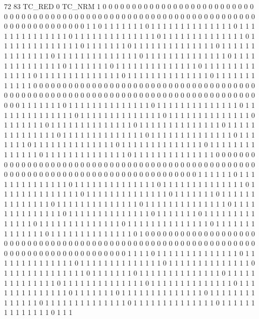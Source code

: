 72 83 TC_RED 0 TC_NRM 1
0 0 0 0 0 0 0 0 0 0 0 0 0 0 0 0 0 0 0 0 0 0 0 0 0 0 0 0 0 0 0 0 0 0 0 0 0 0 0 0 0 0 0 0 0 0 0 0 0 0 0 0 0 0 0 0 0 0 0 0 0 0 0 0 0 0 0 0 0 0 0 0 0 0 0 0 0 0 0 0 0 0 0 
1 1 0 1 1 1 1 1 1 1 0 1 1 1 1 1 1 1 1 1 1 1 1 1 1 0 1 1 1 1 1 1 1 1 1 1 1 1 1 1 0 1 1 1 1 1 1 1 1 1 1 1 1 1 1 0 1 1 1 1 1 1 1 1 1 1 1 1 1 1 0 1 1 1 1 1 1 1 1 1 1 1 1 
1 1 0 1 1 1 1 1 1 1 0 1 1 1 1 1 1 1 1 1 1 1 1 1 1 0 1 1 1 1 1 1 1 1 1 1 1 1 1 1 0 1 1 1 1 1 1 1 1 1 1 1 1 1 1 0 1 1 1 1 1 1 1 1 1 1 1 1 1 1 0 1 1 1 1 1 1 1 1 1 1 1 1 
1 1 0 1 1 1 1 1 1 1 0 1 1 1 1 1 1 1 1 1 1 1 1 1 1 0 1 1 1 1 1 1 1 1 1 1 1 1 1 1 0 1 1 1 1 1 1 1 1 1 1 1 1 1 1 0 1 1 1 1 1 1 1 1 1 1 1 1 1 1 0 1 1 1 1 1 1 1 1 1 1 1 1 
0 0 0 0 0 0 0 0 0 0 0 0 0 0 0 0 0 0 0 0 0 0 0 0 0 0 0 0 0 0 0 0 0 0 0 0 0 0 0 0 0 0 0 0 0 0 0 0 0 0 0 0 0 0 0 0 0 0 0 0 0 0 0 0 0 0 0 0 0 0 0 0 0 0 0 0 0 0 0 0 0 0 0 
0 1 1 1 1 1 1 1 0 1 1 1 1 1 1 1 1 1 1 1 1 1 1 0 1 1 1 1 1 1 1 1 1 1 1 1 1 1 0 1 1 1 1 1 1 1 1 1 1 1 1 1 1 0 1 1 1 1 1 1 1 1 1 1 1 1 1 1 0 1 1 1 1 1 1 1 1 1 1 1 1 1 1 
0 1 1 1 1 1 1 1 0 1 1 1 1 1 1 1 1 1 1 1 1 1 1 0 1 1 1 1 1 1 1 1 1 1 1 1 1 1 0 1 1 1 1 1 1 1 1 1 1 1 1 1 1 0 1 1 1 1 1 1 1 1 1 1 1 1 1 1 0 1 1 1 1 1 1 1 1 1 1 1 1 1 1 
0 1 1 1 1 1 1 1 0 1 1 1 1 1 1 1 1 1 1 1 1 1 1 0 1 1 1 1 1 1 1 1 1 1 1 1 1 1 0 1 1 1 1 1 1 1 1 1 1 1 1 1 1 0 1 1 1 1 1 1 1 1 1 1 1 1 1 1 0 1 1 1 1 1 1 1 1 1 1 1 1 1 1 
0 0 0 0 0 0 0 0 0 0 0 0 0 0 0 0 0 0 0 0 0 0 0 0 0 0 0 0 0 0 0 0 0 0 0 0 0 0 0 0 0 0 0 0 0 0 0 0 0 0 0 0 0 0 0 0 0 0 0 0 0 0 0 0 0 0 0 0 0 0 0 0 0 0 0 0 0 0 0 0 0 0 0 
1 1 1 1 1 1 0 1 1 1 1 1 1 1 1 1 1 1 1 1 1 0 1 1 1 1 1 1 1 1 1 1 1 1 1 1 0 1 1 1 1 1 1 1 1 1 1 1 1 1 1 0 1 1 1 1 1 1 1 1 1 1 1 1 1 1 0 1 1 1 1 1 1 1 1 1 1 1 1 1 1 0 1 
1 1 1 1 1 1 0 1 1 1 1 1 1 1 1 1 1 1 1 1 1 0 1 1 1 1 1 1 1 1 1 1 1 1 1 1 0 1 1 1 1 1 1 1 1 1 1 1 1 1 1 0 1 1 1 1 1 1 1 1 1 1 1 1 1 1 0 1 1 1 1 1 1 1 1 1 1 1 1 1 1 0 1 
1 1 1 1 1 1 0 1 1 1 1 1 1 1 1 1 1 1 1 1 1 0 1 1 1 1 1 1 1 1 1 1 1 1 1 1 0 1 1 1 1 1 1 1 1 1 1 1 1 1 1 0 1 1 1 1 1 1 1 1 1 1 1 1 1 1 0 1 1 1 1 1 1 1 1 1 1 1 1 1 1 0 1 
0 0 0 0 0 0 0 0 0 0 0 0 0 0 0 0 0 0 0 0 0 0 0 0 0 0 0 0 0 0 0 0 0 0 0 0 0 0 0 0 0 0 0 0 0 0 0 0 0 0 0 0 0 0 0 0 0 0 0 0 0 0 0 0 0 0 0 0 0 0 0 0 0 0 0 0 0 0 0 0 0 0 0 
1 1 1 1 0 1 1 1 1 1 1 1 1 1 1 1 1 1 1 0 1 1 1 1 1 1 1 1 1 1 1 1 1 1 0 1 1 1 1 1 1 1 1 1 1 1 1 1 1 0 1 1 1 1 1 1 1 1 1 1 1 1 1 1 0 1 1 1 1 1 1 1 1 1 1 1 1 1 1 0 1 1 1 
1 1 1 1 0 1 1 1 1 1 1 1 1 1 1 1 1 1 1 0 1 1 1 1 1 1 1 1 1 1 1 1 1 1 0 1 1 1 1 1 1 1 1 1 1 1 1 1 1 0 1 1 1 1 1 1 1 1 1 1 1 1 1 1 0 1 1 1 1 1 1 1 1 1 1 1 1 1 1 0 1 1 1 
1 1 1 1 0 1 1 1 1 1 1 1 1 1 1 1 1 1 1 0 1 1 1 1 1 1 1 1 1 1 1 1 1 1 0 1 1 1 1 1 1 1 1 1 1 1 1 1 1 0 1 1 1 1 1 1 1 1 1 1 1 1 1 1 0 1 1 1 1 1 1 1 1 1 1 1 1 1 1 0 1 1 1 
